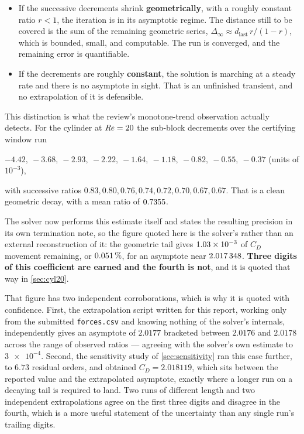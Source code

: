 \begin{itemize}
  \item If the successive decrements shrink \textbf{geometrically}, with a roughly
  constant ratio $r<1$, the iteration is in its asymptotic regime. The distance
  still to be covered is the sum of the remaining geometric series,
  $\Delta_{\infty}\approx d_{\text{last}}\,r/(1-r)$, which is bounded, small, and
  computable. The run is converged, and the remaining error is quantifiable.
  \item If the decrements are roughly \textbf{constant}, the solution is marching at
  a steady rate and there is no asymptote in sight. That is an unfinished transient,
  and no extrapolation of it is defensible.
\end{itemize}

This distinction is what the review's monotone-trend observation actually detects.
For the cylinder at $\mathit{Re}=20$ the sub-block decrements over the certifying window run
\begin{center}
  $-4.42,\ -3.68,\ -2.93,\ -2.22,\ -1.64,\ -1.18,\ -0.82,\ -0.55,\ -0.37$
  \quad (units of $10^{-3}$),
\end{center}
with successive ratios $0.83, 0.80, 0.76, 0.74, 0.72, 0.70, 0.67, 0.67$. That is a
clean geometric decay, with a mean ratio of $\num{0.7355}$.

The solver now performs this estimate itself and states the resulting precision in its
own termination note, so the figure quoted here is the solver's rather than an external
reconstruction of it: the geometric tail gives $\num{1.03e-03}$ of $C_D$
movement remaining, or $\num{0.051}\,\%$, for an asymptote near
$\num{2.017348}$. \textbf{Three digits of this
coefficient are earned and the fourth is not}, and it is quoted that way in
\cref{sec:cyl20}.

That figure has two independent corroborations, which is why it is quoted with
confidence. First, the extrapolation script written for this report, working only from
the submitted \texttt{forces.csv} and knowing nothing of the solver's internals,
independently gives an asymptote of $2.0177$ bracketed between $2.0176$ and $2.0178$
across the range of observed ratios --- agreeing with the solver's own estimate to
$\num{3e-4}$. Second, the sensitivity study of \cref{sec:sensitivity} ran this case
further, to $6.73$ residual orders, and obtained $C_D=\num{2.018119}$, which sits
between the reported value and the extrapolated asymptote, exactly where a longer run
on a decaying tail is required to land. Two runs of different length and two
independent extrapolations agree on the first three digits and disagree in the fourth,
which is a more useful statement of the uncertainty than any single run's trailing
digits.

